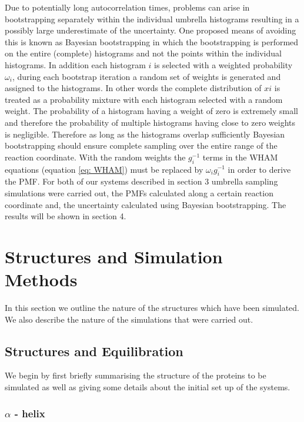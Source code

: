 \documentclass[12pt, onecolumn]{revtex4}    %
\begin{document}
Due to potentially long autocorrelation times, problems can arise in bootstrapping separately within the individual umbrella histograms resulting in a possibly large underestimate of the uncertainty\cite{GWHAM}.  One proposed means of avoiding this is known as Bayesian bootstrapping \cite{GWHAM}in which the bootstrapping is performed on the entire (complete) histograms and not the points within the individual histograms.  In addition each histogram $i$ is selected with a weighted probability $\omega_i$, during each bootstrap iteration a random set of weights is generated and assigned to the histograms.  In other words the complete distribution of $xi$ is treated as a probability mixture with each histogram selected with a random weight.  The probability of a histogram having a weight of zero is extremely small and therefore the probability of multiple histograms having close to zero weights is negligible.  Therefore as long as the histograms overlap sufficiently Bayesian bootstrapping should ensure complete sampling over the entire range of the reaction coordinate\cite{GWHAM}.  With the random weights the $g_i ^ {-1}$ terms in the WHAM equations (equation \ref{eq: WHAM}) must be replaced by $\omega_i g_i ^ {-1}$ in order to derive the PMF\cite{GWHAM}.  For both of our systems described in section 3 umbrella sampling simulations were carried out, the PMFs calculated along a certain reaction coordinate and, the uncertainty calculated using Bayesian bootstrapping.  The results will be shown in section 4.

\section{Structures and Simulation Methods}

In this section we outline the nature of the structures which have been simulated.  We also describe the nature of the simulations that were carried out. 

\subsection{Structures and Equilibration}

We begin by first briefly summarising the structure of the proteins to be simulated as well as giving some details about the initial set up of the systems.

\subsubsection{$\alpha$ - helix}
\end{document}
